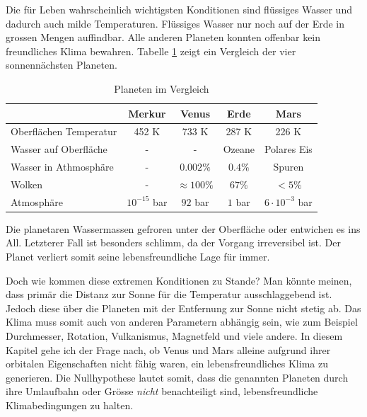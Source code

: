 \begin{refsection}
Die für Leben wahrscheinlich wichtigsten Konditionen sind flüssiges Wasser und dadurch auch milde Temperaturen. Flüssiges Wasser nur noch auf der Erde in grossen Mengen auffindbar.
Alle anderen Planeten konnten offenbar kein freundliches Klima bewahren. Tabelle \ref{planeten_comparison} zeigt ein Vergleich der vier sonnennächsten Planeten.
\begin{center}
\begin{table}
	\center
	\begin{tabular}{l|c c c c}
							& Merkur			& Venus				& Erde		& Mars                  \\
  \hline
  Oberflächen Temperatur	& 452 K				& 733 K				& 287 K		& 226 K                 \\
  Wasser auf Oberfläche		& -					& -					& Ozeane	& Polares Eis			\\
  Wasser in Athmosphäre		& -					& $0.002\%$ 		& $0.4\%$	& Spuren				\\
  Wolken					& -					& $\approx100\%$	& $67\%$  	& $<5\%$                \\
  Atmosphäre				& $10^{-15}$ bar	& $92$ bar			& $1$ bar	& $6 \cdot 10^{-3}$ bar 
\end{tabular}
\caption{Planeten im Vergleich \cite{planeten:temperatures} \cite{planeten:cloudcover}}
\label{planeten_comparison}
\end{table}
\end{center}
Die planetaren Wassermassen gefroren unter der Oberfläche oder entwichen es ins All. Letzterer Fall ist besonders schlimm, da der Vorgang irreversibel ist. Der Planet verliert somit seine lebensfreundliche Lage für immer.

Doch wie kommen diese extremen Konditionen zu Stande? Man könnte meinen, dass primär die Distanz zur Sonne für die Temperatur ausschlaggebend ist. Jedoch diese über die Planeten mit der Entfernung zur Sonne nicht stetig ab.
Das Klima muss somit auch von anderen Parametern abhängig sein, wie zum Beispiel Durchmesser, Rotation, Vulkanismus, Magnetfeld und viele andere.
In diesem Kapitel gehe ich der Frage nach, ob Venus und Mars alleine aufgrund ihrer orbitalen Eigenschaften nicht fähig waren, ein lebensfreundliches Klima zu generieren. Die Nullhypothese lautet somit, dass die genannten Planeten durch ihre Umlaufbahn oder Grösse \textit{nicht} benachteiligt sind, lebensfreundliche Klimabedingungen zu halten.


\end{refsection}
